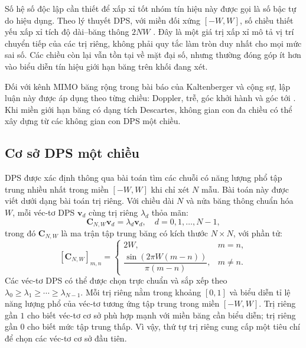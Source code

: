 Số hệ số độc lập cần thiết để xấp xỉ tốt nhóm tín hiệu này được gọi là số bậc tự do hiệu dụng. Theo lý thuyết DPS, với miền đối xứng \([-W,W]\), số chiều thiết yếu xấp xỉ tích độ dài--băng thông \(2NW\) \cite{Slepian1978}. Đây là một giá trị xấp xỉ mô tả vị trí chuyển tiếp của các trị riêng, không phải quy tắc làm tròn duy nhất cho mọi mức sai số. Các chiều còn lại vẫn tồn tại về mặt đại số, nhưng thường đóng góp ít hơn vào biểu diễn tín hiệu giới hạn băng trên khối đang xét.

Đối với kênh MIMO băng rộng trong bài báo của Kaltenberger và cộng sự, lập luận này được áp dụng theo từng chiều: Doppler, trễ, góc khởi hành và góc tới \cite{Kaltenberger2007}. Khi miền giới hạn băng có dạng tích Descartes, không gian con đa chiều có thể xây dựng từ các không gian con DPS một chiều.

\subsection{Cơ sở DPS một chiều}
\label{subsec:ch2_1d_dps}

DPS được xác định thông qua bài toán tìm các chuỗi có năng lượng phổ tập trung nhiều nhất trong miền \([-W,W]\) khi chỉ xét \(N\) mẫu. Bài toán này được viết dưới dạng bài toán trị riêng. Với chiều dài \(N\) và nửa băng thông chuẩn hóa \(W\), mỗi véc-tơ DPS \(\mathbf{v}_d\) cùng trị riêng \(\lambda_d\) thỏa mãn:
\begin{equation}
\mathbf{C}_{N,W}\mathbf{v}_d = \lambda_d \mathbf{v}_d,
\quad d=0,1,\ldots,N-1,
\label{eq:ch2_dps_eigen}
\end{equation}
trong đó \(\mathbf{C}_{N,W}\) là ma trận tập trung băng có kích thước \(N\times N\), với phần tử:
\begin{equation}
\left[\mathbf{C}_{N,W}\right]_{m,n}
=
\begin{cases}
2W, & m=n,\\
\dfrac{\sin\!\left(2\pi W(m-n)\right)}{\pi(m-n)}, & m\ne n.
\end{cases}
\label{eq:ch2_dps_kernel}
\end{equation}
Các véc-tơ DPS có thể được chọn trực chuẩn và sắp xếp theo \(\lambda_0\geq\lambda_1\geq\cdots\geq\lambda_{N-1}\). Mỗi trị riêng nằm trong khoảng \([0,1]\) và biểu diễn tỉ lệ năng lượng phổ của véc-tơ tương ứng tập trung trong miền \([-W,W]\). Trị riêng gần \(1\) cho biết véc-tơ cơ sở phù hợp mạnh với miền băng cần biểu diễn; trị riêng gần \(0\) cho biết mức tập trung thấp. Vì vậy, thứ tự trị riêng cung cấp một tiêu chí để chọn các véc-tơ cơ sở đầu tiên.

